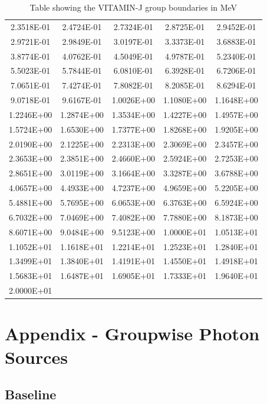 \documentclass[12pt]{article}
\begin{document}
\begin{centering}
\begin{table}[ht!]
\begin{tabular}{| c  c  c  c  c |}
  2.3518E-01 & 2.4724E-01 & 2.7324E-01 & 2.8725E-01 & 2.9452E-01\\
  2.9721E-01 & 2.9849E-01 & 3.0197E-01 & 3.3373E-01 & 3.6883E-01\\
  3.8774E-01 & 4.0762E-01 & 4.5049E-01 & 4.9787E-01 & 5.2340E-01\\
  5.5023E-01 & 5.7844E-01 & 6.0810E-01 & 6.3928E-01 & 6.7206E-01\\
  7.0651E-01 & 7.4274E-01 & 7.8082E-01 & 8.2085E-01 & 8.6294E-01\\
  9.0718E-01 & 9.6167E-01 & 1.0026E+00 & 1.1080E+00 & 1.1648E+00\\
  1.2246E+00 & 1.2874E+00 & 1.3534E+00 & 1.4227E+00 & 1.4957E+00\\
  1.5724E+00 & 1.6530E+00 & 1.7377E+00 & 1.8268E+00 & 1.9205E+00\\
  2.0190E+00 & 2.1225E+00 & 2.2313E+00 & 2.3069E+00 & 2.3457E+00\\
  2.3653E+00 & 2.3851E+00 & 2.4660E+00 & 2.5924E+00 & 2.7253E+00\\
  2.8651E+00 & 3.0119E+00 & 3.1664E+00 & 3.3287E+00 & 3.6788E+00\\
  4.0657E+00 & 4.4933E+00 & 4.7237E+00 & 4.9659E+00 & 5.2205E+00\\
  5.4881E+00 & 5.7695E+00 & 6.0653E+00 & 6.3763E+00 & 6.5924E+00\\
  6.7032E+00 & 7.0469E+00 & 7.4082E+00 & 7.7880E+00 & 8.1873E+00\\
  8.6071E+00 & 9.0484E+00 & 9.5123E+00 & 1.0000E+01 & 1.0513E+01\\
  1.1052E+01 & 1.1618E+01 & 1.2214E+01 & 1.2523E+01 & 1.2840E+01\\
  1.3499E+01 & 1.3840E+01 & 1.4191E+01 & 1.4550E+01 & 1.4918E+01\\
  1.5683E+01 & 1.6487E+01 & 1.6905E+01 & 1.7333E+01 & 1.9640E+01\\
  2.0000E+01 & & & & \\ 
  \hline
\end{tabular}
\caption{Table showing the VITAMIN-J group boundaries in MeV}
\label{tab:vitamin_j}
\end{table}
\end{centering}

\newpage
\clearpage
\section{Appendix - Groupwise Photon Sources}
\subsection{Baseline}
\label{appendix:grp_photon_src_baseline}
\end{document}
